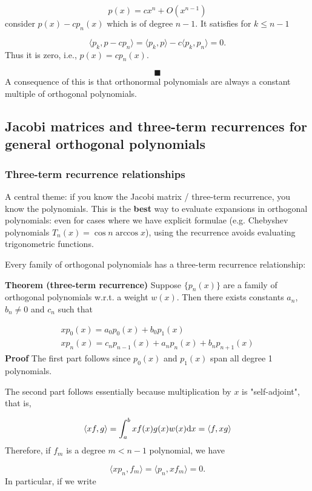\documentclass[12pt,a4paper]{article}
\begin{document}
\[
p(x) = c x^n + O(x^{n-1})
\]
consider $p(x) - c p_n(x)$ which is of degree $n-1$. It satisfies for $k \ensuremath{\leq} n-1$

\[
\ensuremath{\langle}p_k, p - c p_n\ensuremath{\rangle} = \ensuremath{\langle}p_k, p\ensuremath{\rangle} - c \ensuremath{\langle}p_k, p_n\ensuremath{\rangle} = 0.
\]
Thus it is zero, i.e., $p(x) = c p_n(x)$.

\[
\blacksquare
\]
A consequence of this is that orthonormal polynomials are always a constant multiple of orthogonal polynomials.

\subsection{Jacobi matrices and three-term recurrences for general orthogonal polynomials}
\subsubsection{Three-term recurrence relationships}
A central theme: if you know the Jacobi matrix / three-term recurrence, you know the polynomials. This is the \textbf{best} way to evaluate expansions in orthogonal polynomials: even for cases where we have explicit formulae (e.g. Chebyshev polynomials $T_n(x) = \cos n \arccos x$), using the recurrence avoids evaluating trigonometric functions.

Every family of orthogonal polynomials has a three-term recurrence relationship:

\textbf{Theorem (three-term recurrence)} Suppose $\{p_n(x)\}$ are a family of orthogonal polynomials w.r.t. a weight $w(x)$. Then there exists constants $a_n$, $b_n \neq 0$ and $c_n$ such that


\begin{align*}
x p_0(x) = a_0 p_0(x) + b_0 p_1(x) \\
x p_n(x) = c_n p_{n-1}(x) + a_n p_n(x) + b_n p_{n+1}(x)
\end{align*}
\textbf{Proof} The first part follows since $p_0(x)$ and $p_1(x)$ span all degree 1 polynomials.

The second part follows essentially because multiplication by $x$ is "self-adjoint", that is,

\[
\langle x f, g\rangle = \int_a^b x f(x) g(x) w(x) {\rm d}x = \langle f, x g \rangle
\]
Therefore, if $f_m$ is a degree $m < n-1$ polynomial, we have

\[
\langle x p_n, f_m\rangle = \langle p_n, x f_m\rangle = 0.
\]
In particular, if we write
\end{document}
